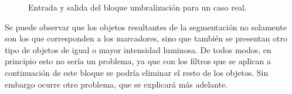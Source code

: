 \begin{figure}[H]
        \centering
        \hspace{5 mm}
  \caption{Entrada y salida del bloque umbralización para un caso real.}
      \label{ejemploabelumbr}
\end{figure}

Se puede observar que los objetos resultantes de la segmentación no solamente son los que corresponden a los marcadores, sino que también se presentan otro tipo de objetos de igual o mayor intensidad luminosa. De todos modos, en principio esto no sería un problema, ya que con los filtros que se aplican a continuación de este bloque se podría eliminar el resto de los objetos. Sin embargo ocurre otro problema, que se explicará más adelante.

